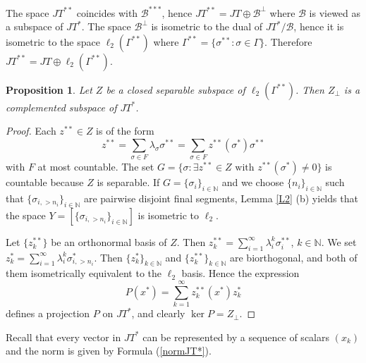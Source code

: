 \documentclass[12pt]{amsart}
\theoremstyle{plain}
\numberwithin{equation}{section}
\newcommand{\N}{\mathbb{N}}
\newcommand{\B}{\mathcal{B}}
\newtheorem{proposition}[theorem]{Proposition}
\begin{document}
The space $JT^{**}$ coincides with $\B^{***}$, hence $JT^{**} = JT \oplus \B^\perp$ where $\B$ is viewed as a subspace of $JT^*$. The space $\B^\perp$ is isometric to the dual of $JT^*/ \B$, hence it is isometric to the space $\ell_2(\Gamma^{**})$ where $\Gamma^{**} = \{ \sigma^{**} : \sigma \in \Gamma\}$. Therefore $JT^{**} = JT \oplus \ell_2(\Gamma^{**})$.


\begin{proposition}\label{P4}
Let $Z$ be a closed separable subspace of $\ell_2(\Gamma^{**})$. Then $Z_\perp$ is a complemented subspace of $JT^*$.
\end{proposition}
\begin{proof}
Each $z^{**} \in Z$ is of the form
\[ z^{**} = \sum_{\sigma \in F} \lambda_\sigma \sigma^{**} = \sum_{\sigma \in F} z^{**}(\sigma^*) \sigma^{**} \]
with $F$ at most countable. The set $G= \{ \sigma : \exists z^{**} \in Z \text{ with } z^{**}(\sigma^*) \neq 0\}$ is countable because $Z$ is separable.
If $G = \{ \sigma_i \}_{i\in \N}$ and we choose $\{n_i\}_{i\in \N}$ such that $\{\sigma_{i, >n_i}\}_{i\in \N}$ are pairwise disjoint final segments, Lemma \ref{L2} (b) yields that the space $Y = [\{\sigma_{i, >n_i}\}_{i\in \N}]$ is isometric to $\ell_2$.

Let $\{z^{**}_k\}$ be an orthonormal basis of $Z$. Then $z^{**}_k = \sum_{i=1}^\infty \lambda_i^k \sigma_i^{**}$, $k \in \N$. We set $z_k^* = \sum_{i=1}^\infty \lambda_{i}^k \sigma_{i, > n_i}^*$.
Then $\{z_k^*\}_{k\in \N}$ and $\{z_k^{**}\}_{k\in \N}$ are biorthogonal, and both of them isometrically equivalent to the $\ell_2$ basis. Hence the expression
\[ P(x^*) = \sum_{k=1}^\infty z_k^{**}(x^*) z_k^* \]
defines a projection $P$ on $JT^*$, and clearly $\ker P = Z_\perp$.
\end{proof}


Recall that every vector in $JT^*$ can be represented by a sequence of scalars $(x_k)$ and the norm is given by Formula (\ref{normJT*}).
\end{document}

